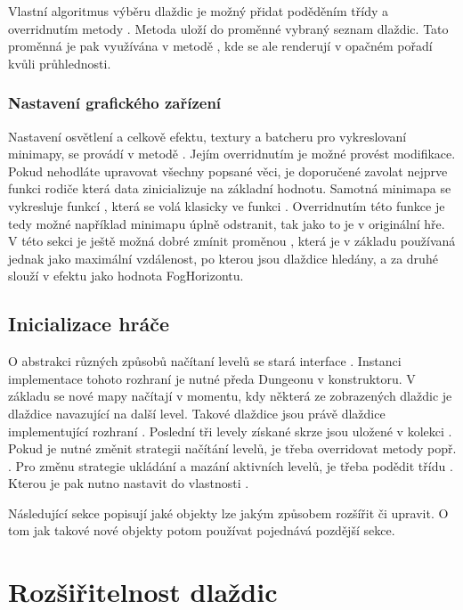Vlastní algoritmus výběru dlaždic je možný přidat poděděním třídy  a overridnutím  metody . 
Metoda uloží do proměnné  vybraný seznam dlaždic. Tato proměnná je pak využívána v metodě , kde se
ale renderují v opačném pořadí kvůli průhlednosti.


\subsubsection{Nastavení grafického zařízení}
Nastavení osvětlení a celkově efektu, textury a batcheru pro vykreslovaní minimapy, se provádí v metodě .
Jejím overridnutím je možné provést modifikace. Pokud nehodláte upravovat všechny popsané věci, je doporučené zavolat nejprve funkci rodiče
která data zinicializuje na základní hodnotu. Samotná minimapa se vykresluje funkcí , která se volá klasicky ve funkci 
. Overridnutím této funkce je tedy možné například minimapu úplně odstranit, tak jako to je v originální hře. V této sekci je ještě
možná dobré zmínit proměnou , která je v základu používaná jednak jako maximální vzdálenost, po kterou jsou dlaždice hledány, a za druhé slouží v efektu jako 
hodnota FogHorizontu.

\subsection{Inicializace hráče}
O abstrakci různých způsobů načítaní levelů se stará interface . Instanci implementace tohoto
rozhraní je nutné předa Dungeonu v konstruktoru. V základu se nové mapy načítají v momentu, kdy některá ze zobrazených
dlaždic je dlaždice navazující na další level. Takové dlaždice jsou právě dlaždice implementující  rozhraní  .
Poslední tři levely získané skrze  jsou uložené v kolekci . Pokud je nutné změnit 
strategii načítání levelů, je třeba overridovat metody  popř. . Pro změnu 
strategie ukládání a mazání aktivních levelů, je třeba podědit třídu . Kterou je pak nutno nastavit
do vlastnosti . 

Následující sekce popisují jaké objekty lze jakým způsobem rozšířit či upravit. O tom jak takové nové objekty potom používat
pojednává pozdější sekce.

\section{Rozšiřitelnost dlaždic}
